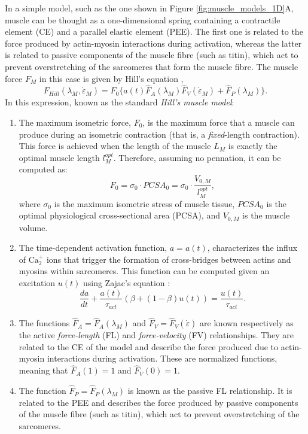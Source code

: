 \documentclass{sfuthesis}
\numberwithin{equation}{section}
\numberwithin{figure}{chapter}
\numberwithin{table}{chapter}
\theoremstyle{definition}
\newcommand{\depsilon}{\dot{\varepsilon}}
\begin{document}
In a simple model, such as the one shown in Figure \ref{fig:muscle_models_1D}A, muscle can be thought as a one-dimensional spring containing a contractile element (CE) and a parallel elastic element (PEE). The first one is related to the force produced by actin-myosin interactions during activation, whereas the latter is related to passive components of the muscle fibre (such as titin), which act to prevent overstretching of the sarcomeres that form the muscle fibre. The muscle force $F_M$ in this case is given by Hill's equation \cite{Zajac1989},
\begin{equation} \label{eq:Hill_force}
    F_{Hill}(\lambda_M, \depsilon_M) = F_0 \Big\{ a(t) \widehat{F}_A(\lambda_M) \widehat{F}_V(\depsilon_M) + \widehat{F}_P(\lambda_M) \Big\}.
\end{equation}
In this expression, known as the standard \textit{Hill's muscle model}:
\begin{enumerate}
    \item The maximum isometric force, $F_0$, is the maximum force that a muscle can produce during an isometric contraction (that is, a \textit{fixed}-length contraction). This force is achieved when the length of the muscle $L_M$ is exactly the optimal muscle length $l_M^{opt}$. Therefore, assuming no pennation, it can be computed as:
    \begin{equation}
        F_0 = \sigma_0 \cdot PCSA_0 = \sigma_0 \cdot \dfrac{V_{0,M}}{l_M^{opt}},
    \end{equation}
    where $\sigma_0$ is the maximum isometric stress of muscle tissue, $PCSA_0$ is the optimal physiological cross-sectional area (PCSA), and $V_{0,M}$ is the muscle volume.
    \item The time-dependent activation function, $a = a(t)$, characterizes the influx of $\mathrm{Ca}_2^+$ ions that trigger the formation of cross-bridges between actins and myosins within sarcomeres. This function can be computed given an excitation $u(t)$ using Zajac's equation \cite{Zajac1989}:
    \begin{equation} \label{eq:zajac}
        \dfrac{da}{dt} + \dfrac{a(t)}{\tau_{act}} \left( \beta + (1-\beta)u(t) \right) = \dfrac{u(t)}{\tau_{act}}.
    \end{equation}
    \item The functions $\widehat{F}_A = \widehat{F}_A(\lambda_M)$ and $\widehat{F}_V = \widehat{F}_V(\depsilon)$ are known respectively as the active \textit{force-length} (FL) and \textit{force-velocity} (FV) relationships. They are related to the CE of the model and describe the force produced due to actin-myosin interactions during activation. These are normalized functions, meaning that $\widehat{F}_A(1) = 1$ and $\widehat{F}_V(0) = 1$.
    \item The function $\widehat{F}_P = \widehat{F}_P(\lambda_M)$ is known as the passive FL relationship. It is related to the PEE and describes the force produced by passive components of the muscle fibre (such as titin), which act to prevent overstretching of the sarcomeres.
\end{enumerate} 
\end{document}
